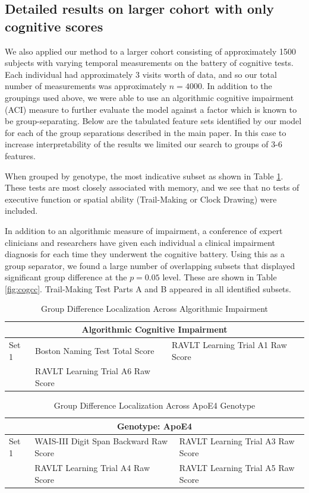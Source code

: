 \subsection{Detailed results on larger cohort with only cognitive scores}
We also applied our method to a larger cohort consisting of approximately 1500 subjects with varying temporal measurements on the battery of cognitive tests. Each individual had approximately 3 visits worth of data, and so our total number of measurements was approximately $n = 4000$. In addition to the groupings used above, we were able to use an algorithmic cognitive impairment (ACI) measure to further evaluate the model against a factor which is known to be group-separating. Below are the tabulated feature sets identified by our model for each of the group separations described in the main paper. In this case to increase interpretability of the results we limited our search to groups of 3-6 features.

When grouped by genotype, the most indicative subset as shown in Table \ref{fig:coggenotype}. These tests are most closely associated with memory, and we see that no tests of executive function or spatial ability (Trail-Making or Clock Drawing) were included.

In addition to an algorithmic measure of impairment, a conference of expert clinicians and researchers have given each individual a clinical impairment diagnosis for each time they underwent the cognitive battery. Using this as a group separator, we found a large number of overlapping subsets that displayed significant group difference at the $p = 0.05$ level. These are shown in Table \ref{fig:cogcc}. Trail-Making Test Parts A and B appeared in all identified subsets.

\begin{table}
	\centering
	\begin{tabular}{p{0.8cm}p{5.5cm}p{6cm}}
		\toprule
		\multicolumn{3}{c}{\textbf{Algorithmic Cognitive Impairment}}\\ \midrule \midrule
		Set 1 & Boston Naming Test Total Score & RAVLT Learning Trial A1 Raw Score \\ 
		 & RAVLT Learning Trial A6 Raw Score &  \\ \bottomrule
		\bottomrule
	\end{tabular}
	\caption{Group Difference Localization Across Algorithmic Impairment}
\end{table}

\begin{table}
	\centering
	\begin{tabular}{p{0.8cm}p{5.5cm}p{6cm}}
		\toprule
		\multicolumn{3}{c}{\textbf{Genotype: ApoE4}}\\ \midrule \midrule
		Set 1 & WAIS-III Digit Span Backward Raw Score & RAVLT Learning Trial A3 Raw Score \\
		& RAVLT Learning Trial A4 Raw Score & RAVLT Learning Trial A5 Raw Score \\
		\bottomrule
		\bottomrule
	\end{tabular}
	\caption{Group Difference Localization Across ApoE4 Genotype}
	\label{fig:coggenotype}
\end{table}

